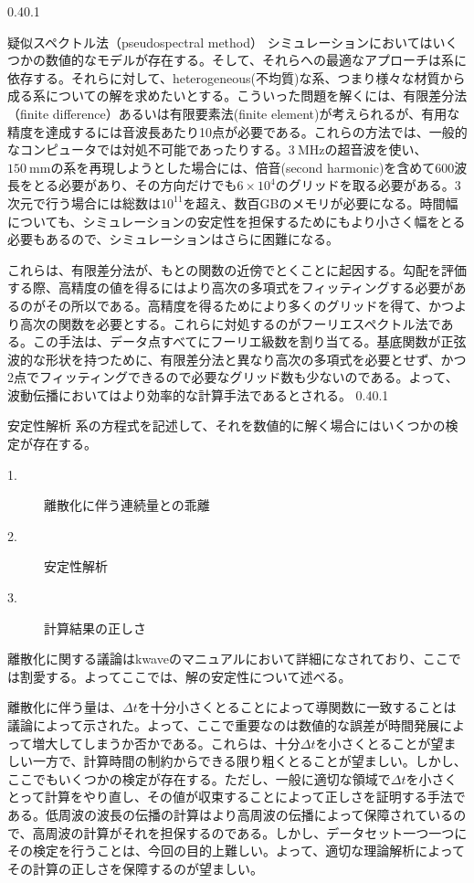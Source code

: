 \documentclass[uplatex]{suribt}
\makeatletter
\renewcommand{\subsection}{%
    \@startsection{subsection}{1}{\z@}%
    {0.4\Cvs}{0.1\Cvs}%
    {\normalfont\normalsize\headfont\raggedright}}
\makeatother
\begin{document}
\subsection{疑似スペクトル法（pseudospectral method）}
シミュレーションにおいてはいくつかの数値的なモデルが存在する。そして、それらへの最適なアプローチは系に依存する。それらに対して、heterogeneous(不均質)な系、つまり様々な材質から成る系についての解を求めたいとする。こういった問題を解くには、有限差分法（finite difference）あるいは有限要素法(finite element)が考えられるが、有用な精度を達成するには音波長あたり10点が必要である。\cite{treeby2010k}これらの方法では、一般的なコンピュータでは対処不可能であったりする。$3 \ \mathrm{MHz}$の超音波を使い、$150 \ \mathrm{mm}$の系を再現しようとした場合には、倍音(second harmonic)を含めて600波長をとる必要があり、その方向だけでも$6 \times 10^4$のグリッドを取る必要がある。3次元で行う場合には総数は$10^11$を超え、数百GBのメモリが必要になる。時間幅についても、シミュレーションの安定性を担保するためにもより小さく幅をとる必要もあるので、シミュレーションはさらに困難になる。\par
これらは、有限差分法が、もとの関数の近傍でとくことに起因する。勾配を評価する際、高精度の値を得るにはより高次の多項式をフィッティングする必要があるのがその所以である。高精度を得るためにより多くのグリッドを得て、かつより高次の関数を必要とする。これらに対処するのがフーリエスペクトル法である。この手法は、データ点すべてにフーリエ級数を割り当てる。基底関数が正弦波的な形状を持つために、有限差分法と異なり高次の多項式を必要とせず、かつ2点でフィッティングできるので必要なグリッド数も少ないのである。よって、波動伝播においてはより効率的な計算手法であるとされる。
\subsection{安定性解析}
系の方程式を記述して、それを数値的に解く場合にはいくつかの検定が存在する。
\begin{description}
    \item[1.]離散化に伴う連続量との乖離
    \item[2.]安定性解析
    \item[3.]計算結果の正しさ
\end{description}
離散化に関する議論はkwaveのマニュアルにおいて詳細になされており、ここでは割愛する。よってここでは、解の安定性について述べる。\par
離散化に伴う量は、$\Delta t $を十分小さくとることによって導関数に一致することは議論によって示された。よって、ここで重要なのは数値的な誤差が時間発展によって増大してしまうか否かである。これらは、十分$\Delta t $を小さくとることが望ましい一方で、計算時間の制約からできる限り粗くとることが望ましい。しかし、ここでもいくつかの検定が存在する。ただし、一般に適切な領域で$\Delta t $を小さくとって計算をやり直し、その値が収束することによって正しさを証明する手法である。低周波の波長の伝播の計算はより高周波の伝播によって保障されているので、高周波の計算がそれを担保するのである。しかし、データセット一つ一つにその検定を行うことは、今回の目的上難しい。よって、適切な理論解析によってその計算の正しさを保障するのが望ましい。
\end{document}
